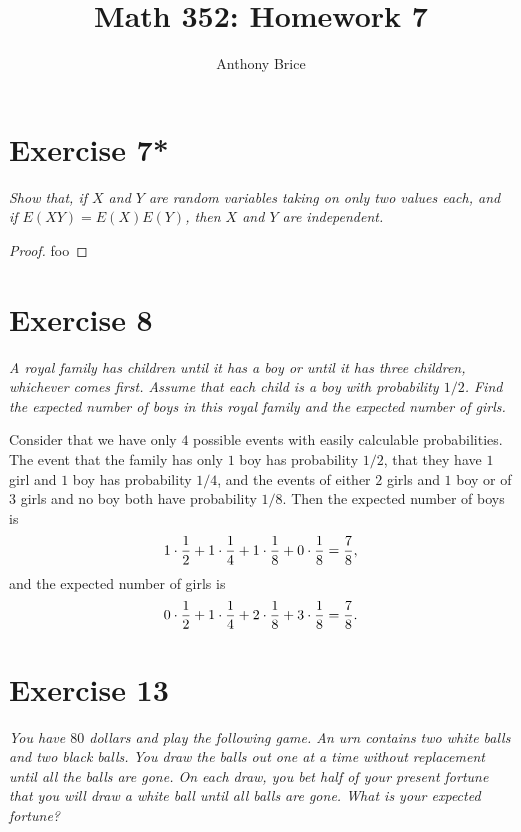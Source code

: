 \documentclass{abrice}
\title{Math 352: Homework 7}
\author{Anthony Brice}
\begin{document}
\maketitle

\section{Exercise 7*}

\emph{Show that, if $X$ and $Y$ are random variables taking on only
  two values each, and if $E(XY) = E(X)E(Y)$, then $X$ and $Y$ are
  independent.}

\bigskip

\begin{proof}
  foo
\end{proof}

\section{Exercise 8}

\emph{A royal family has children until it has a boy or until it has
  three children, whichever comes first. Assume that each child is a
  boy with probability $1/2$. Find the expected number of boys in this
  royal family and the expected number of girls.}

\bigskip

Consider that we have only $4$ possible events with easily calculable
probabilities. The event that the family has only $1$ boy has
probability $1/2$, that they have $1$ girl and $1$ boy has probability
$1/4$, and the events of either $2$ girls and $1$ boy or of $3$ girls
and no boy both have probability $1/8$. Then the expected number of
boys is
\[
1 \cdot {1 \over 2} + 1 \cdot {1 \over 4} + 1 \cdot {1 \over 8} + 0
\cdot {1 \over 8} = {7 \over 8},
\]
and the expected number of girls is
\[
0 \cdot {1 \over 2} + 1 \cdot {1 \over 4} + 2 \cdot {1 \over 8} + 3
\cdot {1 \over 8} = {7 \over 8}.
\]

\section{Exercise 13}

\emph{You have $80$ dollars and play the following game. An urn
  contains two white balls and two black balls. You draw the balls out
  one at a time without replacement until all the balls are gone. On
  each draw, you bet half of your present fortune that you will draw a
  white ball until all balls are gone. What is your expected fortune?}
\end{document}
